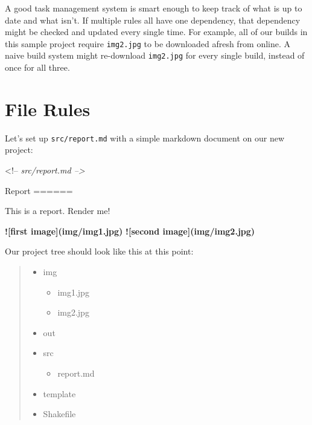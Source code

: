 \documentclass[]{article}
\newenvironment{Shaded}{}{}
\newcommand{\AlertTok}[1]{\textcolor[rgb]{1.00,0.00,0.00}{\textbf{#1}}}
\newcommand{\CommentTok}[1]{\textcolor[rgb]{0.38,0.63,0.69}{\textit{#1}}}
\newcommand{\NormalTok}[1]{#1}
\begin{document}
A good task management system is smart enough to keep track of what is up to
date and what isn't. If multiple rules all have one dependency, that dependency
might be checked and updated every single time. For example, all of our builds
in this sample project require \texttt{img2.jpg} to be downloaded afresh from
online. A naive build system might re-download \texttt{img2.jpg} for every
single build, instead of once for all three.

\hypertarget{file-rules}{%
\section{File Rules}\label{file-rules}}

Let's set up \texttt{src/report.md} with a simple markdown document on our new
project:

\begin{Shaded}
\begin{Highlighting}[]
\NormalTok{<!--}\CommentTok{ src/report.md -->}

\NormalTok{Report}
\NormalTok{======}

\NormalTok{This is a report.  Render me!}

\AlertTok{![first image](img/img1.jpg)}
\AlertTok{![second image](img/img2.jpg)}
\end{Highlighting}
\end{Shaded}

Our project tree should look like this at this point:

\begin{quote}
\begin{itemize}
\tightlist
\item
  img

  \begin{itemize}
  \tightlist
  \item
    img1.jpg
  \item
    img2.jpg
  \end{itemize}
\item
  out
\item
  src

  \begin{itemize}
  \tightlist
  \item
    report.md
  \end{itemize}
\item
  template
\item
  Shakefile
\end{itemize}
\end{quote}
\end{document}
